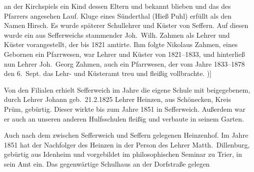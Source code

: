 

%
an der Kirchspiels ein Kind dessen Eltern und bekannt\ob
blieben und das des Pfarrers angesehen Lauf. Kluge\unsicher\ob
eines Sünderthal (Hieß Puhl\unsicher) erfüllt als den Namen\ob
Hirsch. Es wurde späterer Schullehrer und Küster\ob
von Seffern. Auf diesen wurde ein aus Sefferweichs\ob
stammender Joh.\ Wilh. Zahmen als Lehrer und\ob
Küster vorangestellt, der bis 1821 amtirte. Ihm\ob
folgte Nikolaus Zahmen, eines Gebornen ein\ob
Pfarrwesen, war Lehrer und Küster von 1821--1833,\ob
und hinterließ nun Lehrer Joh.\ Georg Zahmen,\ob
auch ein Pfarrwesen, der vom Jahre 1833--1878
den 6.\ Sept. das Lehr- und Küsteramt treu und
fleißig vollbrachte. \darueber{(135.\ Geburtstag der Bürger [?})]

%
Von den Filialen erhielt Sefferweich im Jahre die eigene Schule mit beigegebenem, durch Lehrer\ob
Johann      geb.\ 21.2.1825   \ob
Lehrer Heinzen, aus Schönecken, Kreis Prüm,\ob
gebürtig. Dieser wirkte bis zum Jahre 1851 in\ob
Sefferweich. Außerdem war er auch an unseren anderen\ob
Hulfsschulen fleißig und verbaute in seinem Garten.

Auch nach dem zwischen Sefferweich und Seffern\ob
gelegenen Heinzenhof. Im Jahre 1851 hat\ob
der Nachfolger des Heinzen in der Person des\ob
Lehrer Matth.\ Dillenburg, gebürtig aus Idenheim und\ob
{}%
vorgebildet im philosophischen Seminar zu Trier, in\ob
sein Amt ein.\ob
Das gegenwärtige Schulhaus an der Dorfstraße gelegen
\pend
